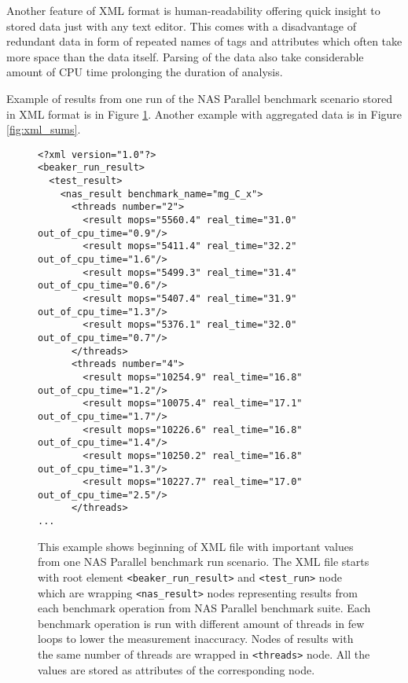 Another feature of XML format is human-readability offering quick insight to stored
data just with any text editor.
This comes with a disadvantage of redundant data in form of repeated names of
tags and attributes which often take more space than the data itself. Parsing of
the data also take considerable amount of CPU time prolonging the duration of
analysis.


Example of results from one run of the NAS Parallel benchmark scenario stored in
XML format is in Figure \ref{fig:xml_result}. Another example with aggregated
data is in Figure \ref{fig:xml_sums}.

\begin{figure}
  \small
  \begin{verbatim}
<?xml version="1.0"?>
<beaker_run_result>
  <test_result>
    <nas_result benchmark_name="mg_C_x">
      <threads number="2">
        <result mops="5560.4" real_time="31.0" out_of_cpu_time="0.9"/>
        <result mops="5411.4" real_time="32.2" out_of_cpu_time="1.6"/>
        <result mops="5499.3" real_time="31.4" out_of_cpu_time="0.6"/>
        <result mops="5407.4" real_time="31.9" out_of_cpu_time="1.3"/>
        <result mops="5376.1" real_time="32.0" out_of_cpu_time="0.7"/>
      </threads>
      <threads number="4">
        <result mops="10254.9" real_time="16.8" out_of_cpu_time="1.2"/>
        <result mops="10075.4" real_time="17.1" out_of_cpu_time="1.7"/>
        <result mops="10226.6" real_time="16.8" out_of_cpu_time="1.4"/>
        <result mops="10250.2" real_time="16.8" out_of_cpu_time="1.3"/>
        <result mops="10227.7" real_time="17.0" out_of_cpu_time="2.5"/>
      </threads>
...
\end{verbatim}
  \normalsize
  \caption{This example shows beginning of XML file with important values from one NAS
    Parallel benchmark run scenario. The XML file starts with root element
    \texttt{<beaker\_run\_result>} and \texttt{<test\_run>} node which are wrapping
    \texttt{<nas\_result>} nodes representing results from each benchmark operation
    from NAS Parallel benchmark suite. Each benchmark operation is run with
    different amount of threads in few loops to lower the measurement inaccuracy.
    Nodes of results with the same number of threads are wrapped in
    \texttt{<threads>} node. All the values are stored as attributes of the
    corresponding node.}
  \label{fig:xml_result}
\end{figure}

